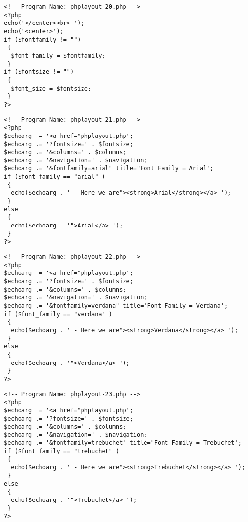 \documentclass[12pt,a4paper,twosides,ngerman]{scrbook}
\begin{document}
\begin{center}
\begin{minipage}[t]{155mm}
\begin{lstlisting}[captionpos=b, caption=Layout - phplayout-20.php]
<!-- Program Name: phplayout-20.php -->
<?php
echo('</center><br> ');
echo('<center>');
if ($fontfamily != "")
 {
  $font_family = $fontfamily;
 }
if ($fontsize != "")
 {
  $font_size = $fontsize;
 }
?>
\end{lstlisting}
\end{minipage}
\end{center} 

\begin{center}
\begin{minipage}[t]{155mm}
\begin{lstlisting}[captionpos=b, caption=Layout - phplayout-21.php]
<!-- Program Name: phplayout-21.php -->
<?php
$echoarg  = '<a href="phplayout.php';
$echoarg .= '?fontsize=' . $fontsize; 
$echoarg .= '&columns=' . $columns;
$echoarg .= '&navigation=' . $navigation;
$echoarg .= '&fontfamily=arial" title="Font Family = Arial';
if ($font_family == "arial" )
 {
  echo($echoarg . ' - Here we are"><strong>Arial</strong></a> ');
 }
else
 {
  echo($echoarg . '">Arial</a> ');
 }
?>
\end{lstlisting}
\end{minipage}
\end{center} 

\begin{center}
\begin{minipage}[t]{155mm}
\begin{lstlisting}[captionpos=b, caption=Layout - phplayout-22.php]
<!-- Program Name: phplayout-22.php -->
<?php
$echoarg  = '<a href="phplayout.php';
$echoarg .= '?fontsize=' . $fontsize; 
$echoarg .= '&columns=' . $columns;
$echoarg .= '&navigation=' . $navigation;
$echoarg .= '&fontfamily=verdana" title="Font Family = Verdana';
if ($font_family == "verdana" )
 {
  echo($echoarg . ' - Here we are"><strong>Verdana</strong></a> ');
 }
else
 {
  echo($echoarg . '">Verdana</a> ');
 }
?>
\end{lstlisting}
\end{minipage}
\end{center} 

\begin{center}
\begin{minipage}[t]{155mm}
\begin{lstlisting}[captionpos=b, caption=Layout - phplayout-23.php]
<!-- Program Name: phplayout-23.php -->
<?php
$echoarg  = '<a href="phplayout.php';
$echoarg .= '?fontsize=' . $fontsize; 
$echoarg .= '&columns=' . $columns;
$echoarg .= '&navigation=' . $navigation;
$echoarg .= '&fontfamily=trebuchet" title="Font Family = Trebuchet';
if ($font_family == "trebuchet" )
 {
  echo($echoarg . ' - Here we are"><strong>Trebuchet</strong></a> ');
 }
else
 {
  echo($echoarg . '">Trebuchet</a> ');
 }
?>
\end{lstlisting}
\end{minipage}
\end{center} 
\end{document}
